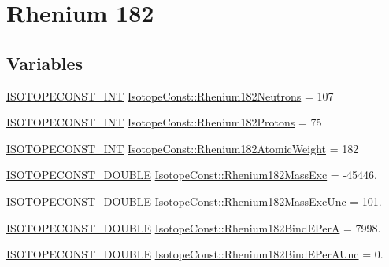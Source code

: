 \hypertarget{group___isotope_const-_rhenium-_re182}{}\section{Rhenium 182}
\label{group___isotope_const-_rhenium-_re182}
\subsection*{Variables}
\begin{DoxyCompactItemize}
\item 
\mbox{\hyperlink{group___isotope_const-_macros_ga5f18360b3e99483a35c32d789e62621c}{I\+S\+O\+T\+O\+P\+E\+C\+O\+N\+S\+T\+\_\+\+I\+NT}} \mbox{\hyperlink{group___isotope_const-_rhenium-_re182_gac74dc2b29b613ad2dc9c9f73979bc3cd}{Isotope\+Const\+::\+Rhenium182\+Neutrons}} = 107
\item 
\mbox{\hyperlink{group___isotope_const-_macros_ga5f18360b3e99483a35c32d789e62621c}{I\+S\+O\+T\+O\+P\+E\+C\+O\+N\+S\+T\+\_\+\+I\+NT}} \mbox{\hyperlink{group___isotope_const-_rhenium-_re182_ga09d6320f94bd8b6e799a35630c6d1748}{Isotope\+Const\+::\+Rhenium182\+Protons}} = 75
\item 
\mbox{\hyperlink{group___isotope_const-_macros_ga5f18360b3e99483a35c32d789e62621c}{I\+S\+O\+T\+O\+P\+E\+C\+O\+N\+S\+T\+\_\+\+I\+NT}} \mbox{\hyperlink{group___isotope_const-_rhenium-_re182_ga0fde7c5ae18ecb6c6ba02fce2b8a94dd}{Isotope\+Const\+::\+Rhenium182\+Atomic\+Weight}} = 182
\item 
\mbox{\hyperlink{group___isotope_const-_macros_ga8f45a7272ce02c0b4c65c44636ed719a}{I\+S\+O\+T\+O\+P\+E\+C\+O\+N\+S\+T\+\_\+\+D\+O\+U\+B\+LE}} \mbox{\hyperlink{group___isotope_const-_rhenium-_re182_ga97f74113fb79c964ae54ea629b6c5572}{Isotope\+Const\+::\+Rhenium182\+Mass\+Exc}} = -\/45446.
\item 
\mbox{\hyperlink{group___isotope_const-_macros_ga8f45a7272ce02c0b4c65c44636ed719a}{I\+S\+O\+T\+O\+P\+E\+C\+O\+N\+S\+T\+\_\+\+D\+O\+U\+B\+LE}} \mbox{\hyperlink{group___isotope_const-_rhenium-_re182_ga82f3e60f177dd91aafef65ae5ecc9533}{Isotope\+Const\+::\+Rhenium182\+Mass\+Exc\+Unc}} = 101.
\item 
\mbox{\hyperlink{group___isotope_const-_macros_ga8f45a7272ce02c0b4c65c44636ed719a}{I\+S\+O\+T\+O\+P\+E\+C\+O\+N\+S\+T\+\_\+\+D\+O\+U\+B\+LE}} \mbox{\hyperlink{group___isotope_const-_rhenium-_re182_ga90166d95cee64096b2823adae10998ca}{Isotope\+Const\+::\+Rhenium182\+Bind\+E\+PerA}} = 7998.
\item 
\mbox{\hyperlink{group___isotope_const-_macros_ga8f45a7272ce02c0b4c65c44636ed719a}{I\+S\+O\+T\+O\+P\+E\+C\+O\+N\+S\+T\+\_\+\+D\+O\+U\+B\+LE}} \mbox{\hyperlink{group___isotope_const-_rhenium-_re182_gaf7c4449c098acb2f5f53d23ae003c690}{Isotope\+Const\+::\+Rhenium182\+Bind\+E\+Per\+A\+Unc}} = 0.

\end{DoxyCompactItemize}
